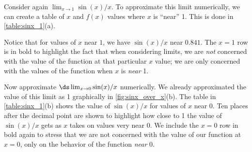 
Consider again $\lim_{x\to 1}\sin (x)/x$. To approximate this limit numerically, we can create a table of $x$ and $f(x)$ values where $x$ is ``near'' 1. This is done in \autoref{table:sinx_1}(a).

Notice that for values of $x$ near $1$, we have $\sin (x)/x$ near $0.841$. The $x=1$ row is in bold to highlight the fact that when considering limits, we are \emph{not} concerned with the value of the function at that particular $x$ value; we are only concerned with the values of the function when $x$ is \emph{near} 1. 

Now approximate $\ds\lim_{x\to 0} \sin(x)/x$ numerically. We already approximated the value of this limit as 1 graphically in \autoref{fig:sinx_over_x}(b). The table in \autoref{table:sinx_1}(b) shows the value of $\sin(x)/x$ for values of $x$ near 0. Ten places after the decimal point are shown to highlight how close to 1 the value of $\sin(x)/x$ gets as $x$ takes on values very near 0. We include the $x=0$ row in bold again to stress that we are not concerned with the value of our function at $x=0$, only on the behavior of the function \emph{near} 0. 

